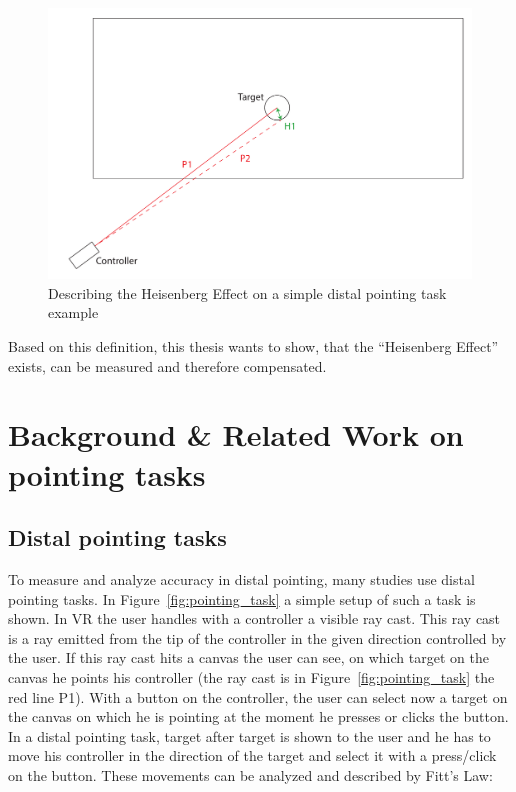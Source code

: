 \begin{figure}[h]
    \centering
    \includegraphics[width=.9\columnwidth]{graphics/heisenberg_effect.pdf}
    \caption{Describing the Heisenberg Effect on a simple distal pointing task example}
    \label{fig:heisenberg_effect}
\end{figure}

Based on this definition, this thesis wants to show, that the ``Heisenberg Effect'' exists, can be measured and therefore compensated.

\section{Background \& Related Work on pointing tasks}
\label{sec:related-work:pointion-tasks}

\subsection{Distal pointing tasks}

To measure and analyze accuracy in distal pointing, many studies use distal pointing tasks. In Figure~\ref{fig:pointing_task} a simple setup of such a task is shown. In VR the user handles with a controller a visible ray cast. This ray cast is a ray emitted from the tip of the controller in the given direction controlled by the user. If this ray cast hits a canvas the user can see, on which target on the canvas he points his controller (the ray cast is in Figure~\ref{fig:pointing_task} the red line P1). With a button on the controller, the user can select now a target on the canvas on which he is pointing at the moment he presses or clicks the button. In a distal pointing task, target after target is shown to the user and he has to move his controller in the direction of the target and select it with a press/click on the button.
These movements can be analyzed and described by Fitt's Law:

